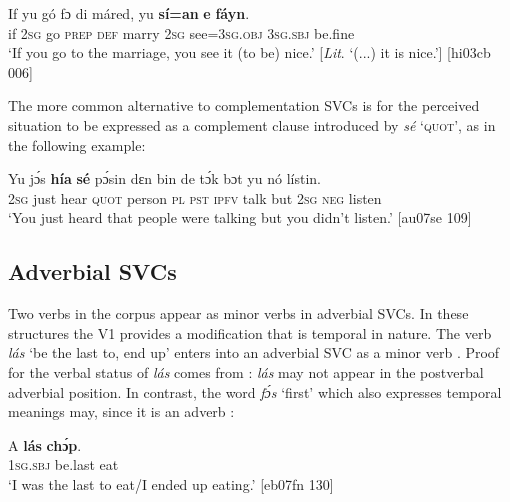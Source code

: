 \ea%
    \label{ex:key:1578}
    \gll If  yu  gó  fɔ  di  máred,  yu  \textbf{sí=an}    \textbf{e}    \textbf{fáyn}.\\
if  \textsc{2sg}  go  \textsc{prep}  \textsc{def}  marry  \textsc{2sg}  see=\textsc{3sg.obj}  \textsc{3sg.sbj}  be.fine\\

\glt ‘If you go to the marriage, you see it (to be) nice.’ [\textit{Lit}. ‘(...) it is nice.’] [hi03cb 006]
\z

The more common alternative to complementation SVCs is for the perceived situation to be expressed as a complement clause introduced by \textit{sé} ‘\textsc{quot}’, as in the following example: 


\ea%
    \label{ex:key:1579}
    \gll Yu  jɔ́s  \textbf{hía}    \textbf{sé}    pɔ́sin  dɛn  bin  de  tɔ́k  bɔt  yu  nó  lístin.\\
\textsc{2sg}  just  hear    \textsc{quot}    person  \textsc{pl}  \textsc{pst}  \textsc{ipfv}  talk  but  \textsc{2sg}  \textsc{neg}  listen\\

\glt ‘You just heard that people were talking but you didn’t listen.’ [au07se 109]
\z

\subsection{Adverbial SVCs}\label{sec:11.2.5}

Two verbs in the corpus appear as minor verbs in adverbial SVCs. In these structures the V1 provides a modification that is temporal in nature. The verb \textit{lás} ‘be the last to, end up’ enters into an adverbial SVC as a minor verb . Proof for the verbal status of \textit{lás} comes from : \textit{lás} may not appear in the postverbal adverbial position. In contrast, the word \textit{fɔ́s} ‘first’ which also expresses temporal meanings may, since it is an adverb : 


\ea%
    \label{ex:key:1580}
    \gll \MakeUppercase{A}   \textbf{lás}    \textbf{chɔ́p}.\\
\textsc{1sg.sbj}  be.last  eat\\

\glt ‘I was the last to eat/I ended up eating.’ [eb07fn 130]
\z


\z


